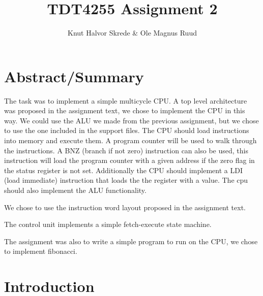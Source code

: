 \documentclass[11pt]{report}
\title{TDT4255 Assignment 2}
\author{Knut Halvor Skrede \& Ole Magnus Ruud}
\begin{document}
\maketitle
\clearpage


\section*{Abstract/Summary}
        

The task was to implement a simple multicycle CPU. A top level architecture 
was proposed in the assignment text, we chose to implement the CPU in this way. 
We could use the ALU we made from the previous assignment, but we chose to use
the one included in the support files. The CPU should load instructions into 
memory and execute them. A program counter will be used to walk through the 
instructions. A BNZ (branch if not zero) instruction can also be used, this 
instruction will load the program counter with a given address if the zero flag
in the status register is not set. Additionally the CPU should implement a 
LDI (load immediate) instruction that loads the the register with a value. 
The cpu should also implement the ALU functionality.

We chose to use the instruction word layout proposed in the assignment text.

The control unit implements a simple fetch-execute state machine.

The assignment was also to write a simple program to run on the CPU, 
we chose to implement fibonacci.

\section*{Introduction}

\end{document}
